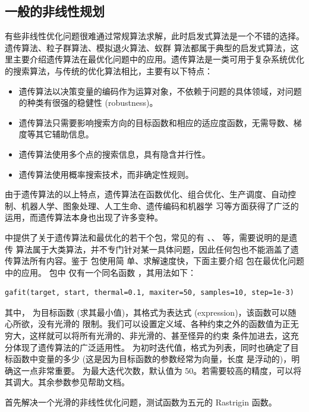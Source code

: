 \subsection{一般的非线性规划}
有些非线性优化问题很难通过常规算法求解，此时启发式算法是一个不错的选择。遗传算法、粒子群算法、模拟退火算法、蚁群
算法都属于典型的启发式算法，这里主要介绍遗传算法在最优化问题中的应用。遗传算法是一类可用于复杂系统优化
的搜索算法，与传统的优化算法相比，主要有以下特点：
\begin{itemize}
\item  遗传算法以决策变量的编码作为运算对象，不依赖于问题的具体领域，对问题的种类有很强的稳健性 (robustness)。
\item  遗传算法只需要影响搜索方向的目标函数和相应的适应度函数，无需导数、梯度等其它辅助信息。
\item  遗传算法使用多个点的搜索信息，具有隐含并行性。
\item  遗传算法使用概率搜索技术，而非确定性规则。
\end{itemize}

由于遗传算法的以上特点，遗传算法在函数优化、组合优化、生产调度、自动控制、机器人学、图象处理、人工生命、遗传编码和机器学
习等方面获得了广泛的运用，而遗传算法本身也出现了许多变种。


\R 中提供了关于遗传算法和最优化的若干个包，常见的有 、、 等，需要说明的是遗传
算法属于大类算法，并不专门针对某一具体问题，因此任何包也不能涵盖了遗传算法所有内容。鉴于  包使用简
单、求解速度快，下面主要介绍  包\citep{gafit02}在最优化问题中的应用。 包中
仅有一个同名函数 ，其用法如下：

\begin{verbatim}
gafit(target, start, thermal=0.1, maxiter=50, samples=10, step=1e-3)
\end{verbatim}

其中， 为目标函数 (求其最小值)，其格式为表达式 (expression)，该函数可以随心所欲，没有光滑的
限制。我们可以设置定义域、各种约束之外的函数值为正无穷大，这样就可以将所有光滑的、非光滑的、甚至怪异的约束
条件加进去，这充分体现了遗传算法的广泛适用性。
 为初时迭代值，格式为列表，同时也确定了目标函数中变量的多少 (这是因为目标函数的参数经常为向量，长度
是浮动的)，明确这一点非常重要。
 为最大迭代次数，默认值为 50。若需要较高的精度，可以将其调大。其余参数参见帮助文档。

\begin{exmp}
首先解决一个光滑的非线性优化问题，测试函数为五元的 Rastrigin 函数。
\end{exmp}

